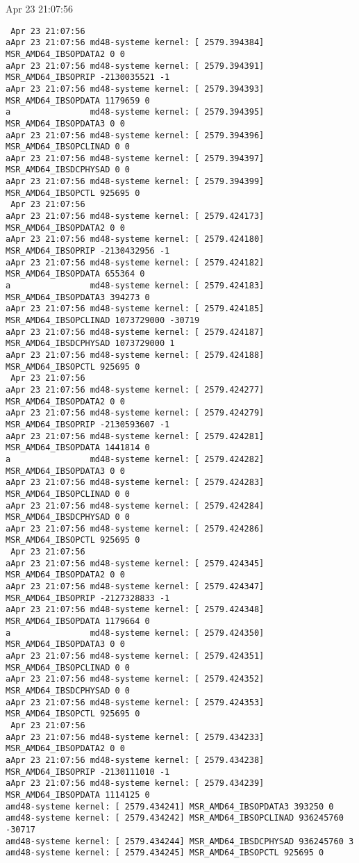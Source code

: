  Apr 23 21:07:56    \begin{verbatim}
 Apr 23 21:07:56 
aApr 23 21:07:56 md48-systeme kernel: [ 2579.394384] MSR_AMD64_IBSOPDATA2 0 0
aApr 23 21:07:56 md48-systeme kernel: [ 2579.394391] MSR_AMD64_IBSOPRIP -2130035521 -1
aApr 23 21:07:56 md48-systeme kernel: [ 2579.394393] MSR_AMD64_IBSOPDATA 1179659 0
a                md48-systeme kernel: [ 2579.394395] MSR_AMD64_IBSOPDATA3 0 0
aApr 23 21:07:56 md48-systeme kernel: [ 2579.394396] MSR_AMD64_IBSOPCLINAD 0 0
aApr 23 21:07:56 md48-systeme kernel: [ 2579.394397] MSR_AMD64_IBSDCPHYSAD 0 0
aApr 23 21:07:56 md48-systeme kernel: [ 2579.394399] MSR_AMD64_IBSOPCTL 925695 0
 Apr 23 21:07:56 
aApr 23 21:07:56 md48-systeme kernel: [ 2579.424173] MSR_AMD64_IBSOPDATA2 0 0
aApr 23 21:07:56 md48-systeme kernel: [ 2579.424180] MSR_AMD64_IBSOPRIP -2130432956 -1
aApr 23 21:07:56 md48-systeme kernel: [ 2579.424182] MSR_AMD64_IBSOPDATA 655364 0
a                md48-systeme kernel: [ 2579.424183] MSR_AMD64_IBSOPDATA3 394273 0
aApr 23 21:07:56 md48-systeme kernel: [ 2579.424185] MSR_AMD64_IBSOPCLINAD 1073729000 -30719
aApr 23 21:07:56 md48-systeme kernel: [ 2579.424187] MSR_AMD64_IBSDCPHYSAD 1073729000 1
aApr 23 21:07:56 md48-systeme kernel: [ 2579.424188] MSR_AMD64_IBSOPCTL 925695 0
 Apr 23 21:07:56 
aApr 23 21:07:56 md48-systeme kernel: [ 2579.424277] MSR_AMD64_IBSOPDATA2 0 0
aApr 23 21:07:56 md48-systeme kernel: [ 2579.424279] MSR_AMD64_IBSOPRIP -2130593607 -1
aApr 23 21:07:56 md48-systeme kernel: [ 2579.424281] MSR_AMD64_IBSOPDATA 1441814 0
a                md48-systeme kernel: [ 2579.424282] MSR_AMD64_IBSOPDATA3 0 0
aApr 23 21:07:56 md48-systeme kernel: [ 2579.424283] MSR_AMD64_IBSOPCLINAD 0 0
aApr 23 21:07:56 md48-systeme kernel: [ 2579.424284] MSR_AMD64_IBSDCPHYSAD 0 0
aApr 23 21:07:56 md48-systeme kernel: [ 2579.424286] MSR_AMD64_IBSOPCTL 925695 0
 Apr 23 21:07:56 
aApr 23 21:07:56 md48-systeme kernel: [ 2579.424345] MSR_AMD64_IBSOPDATA2 0 0
aApr 23 21:07:56 md48-systeme kernel: [ 2579.424347] MSR_AMD64_IBSOPRIP -2127328833 -1
aApr 23 21:07:56 md48-systeme kernel: [ 2579.424348] MSR_AMD64_IBSOPDATA 1179664 0
a                md48-systeme kernel: [ 2579.424350] MSR_AMD64_IBSOPDATA3 0 0
aApr 23 21:07:56 md48-systeme kernel: [ 2579.424351] MSR_AMD64_IBSOPCLINAD 0 0
aApr 23 21:07:56 md48-systeme kernel: [ 2579.424352] MSR_AMD64_IBSDCPHYSAD 0 0
aApr 23 21:07:56 md48-systeme kernel: [ 2579.424353] MSR_AMD64_IBSOPCTL 925695 0
 Apr 23 21:07:56 
aApr 23 21:07:56 md48-systeme kernel: [ 2579.434233] MSR_AMD64_IBSOPDATA2 0 0
aApr 23 21:07:56 md48-systeme kernel: [ 2579.434238] MSR_AMD64_IBSOPRIP -2130111010 -1
aApr 23 21:07:56 md48-systeme kernel: [ 2579.434239] MSR_AMD64_IBSOPDATA 1114125 0
amd48-systeme kernel: [ 2579.434241] MSR_AMD64_IBSOPDATA3 393250 0
amd48-systeme kernel: [ 2579.434242] MSR_AMD64_IBSOPCLINAD 936245760 -30717
amd48-systeme kernel: [ 2579.434244] MSR_AMD64_IBSDCPHYSAD 936245760 3
amd48-systeme kernel: [ 2579.434245] MSR_AMD64_IBSOPCTL 925695 0


\end{verbatim}
